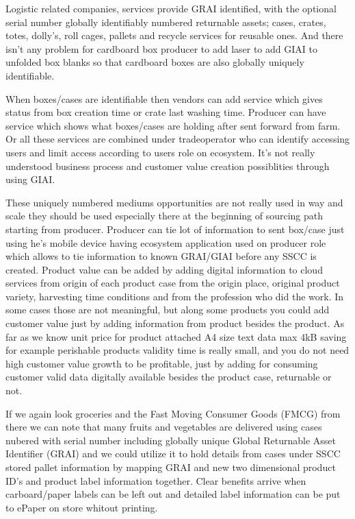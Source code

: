 Logistic related companies, services provide GRAI\cite{GRAI} identified, with
the optional serial number globally identifiably numbered returnable assets;
cases, crates, totes, dolly's, roll cages, pallets and recycle services for
reusable ones. And there isn't any problem for cardboard box producer to add
laser to add GIAI\cite{GIAI}\cite{CajoMakeBright} to unfolded box blanks so
that cardboard boxes are also globally uniquely identifiable.

When boxes/cases are identifiable then vendors can add service which gives
status from box creation time or crate last washing time. Producer can have
service which shows what boxes/cases are holding after sent forward from farm.
Or all these services are combined under tradeoperator who can identify
accessing users and limit access according to users role on ecosystem. It's not
really understood business process and customer value creation possiblities
through using GIAI.

These uniquely numbered mediums opportunities are not really used in way and
scale they should be used especially there at the beginning of sourcing path
starting from producer. Producer can tie lot of information to sent box/case
just using he's mobile device having ecosystem application used on producer
role which allows to tie information to known GRAI/GIAI before any SSCC is
created. Product value can be added by adding digital information to cloud
services from origin of each product case from the origin place, original
product variety, harvesting time conditions and from the profession who did
the work. In some cases those are not meaningful, but along some products you
could add customer value just by adding information from product besides the
product. As far as we know unit price for product attached A4 size text data
max 4kB saving for example perishable products validity time is really small,
and you do not need high customer value growth to be profitable, just by
adding for consuming customer valid data digitally available besides the
product case, returnable or not.

If we again look groceries and the Fast Moving Consumer Goods (FMCG) from there
we can note that many fruits and vegetables are delivered using cases nubered
with serial number including globally unique Global Returnable Asset Identifier
(GRAI) and we could utilize it to hold details from cases under SSCC stored
pallet information by mapping GRAI and new two dimensional product ID's and
product label information together. Clear benefits arrive when carboard/paper
labels can be left out and detailed label information can be put to ePaper on
store whitout printing.

